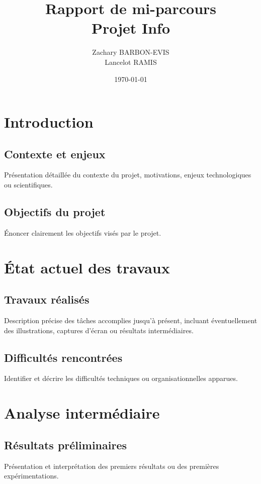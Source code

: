 \documentclass[a4paper,12pt]{report}
\title{Rapport de mi-parcours \\ \textbf{Projet Info}}
\author{Zachary BARBON-EVIS \\ Lancelot RAMIS \\}
\date{\today}
\begin{document}
\maketitle

\tableofcontents
\newpage

\chapter{Introduction}

\section{Contexte et enjeux}
Présentation détaillée du contexte du projet, motivations, enjeux technologiques ou scientifiques.

\section{Objectifs du projet}
Énoncer clairement les objectifs visés par le projet.

\chapter{État actuel des travaux}

\section{Travaux réalisés}
Description précise des tâches accomplies jusqu’à présent, incluant éventuellement des illustrations, captures d'écran ou résultats intermédiaires.

\section{Difficultés rencontrées}
Identifier et décrire les difficultés techniques ou organisationnelles apparues.

\chapter{Analyse intermédiaire}

\section{Résultats préliminaires}
Présentation et interprétation des premiers résultats ou des premières expérimentations.
\end{document}
